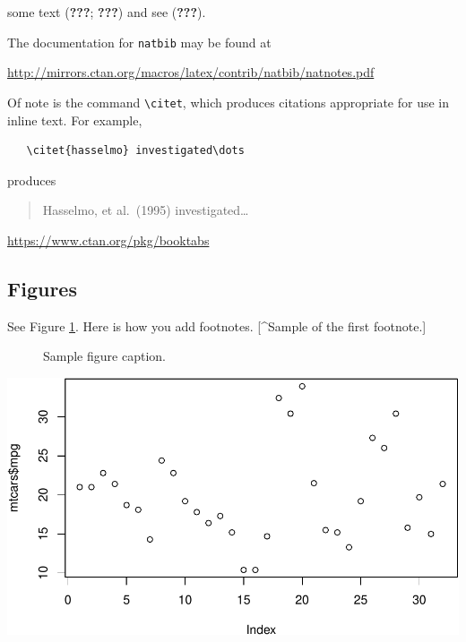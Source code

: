 \documentclass{article}
\begin{document}
\label{sec:others}

\lipsum[8] some text ({\textbf{???}}; {\textbf{???}}) and see
({\textbf{???}}).

The documentation for \verb+natbib+ may be found at

\begin{center}
  \url{http://mirrors.ctan.org/macros/latex/contrib/natbib/natnotes.pdf}
\end{center}

Of note is the command \verb+\citet+, which produces citations
appropriate for use in inline text. For example,

\begin{verbatim}
   \citet{hasselmo} investigated\dots
\end{verbatim}

produces

\begin{quote}
  Hasselmo, et al.\ (1995) investigated\dots
\end{quote}

\begin{center}
  \url{https://www.ctan.org/pkg/booktabs}
\end{center}

\hypertarget{figures}{%
\subsection{Figures}\label{figures}}

\lipsum[10] See Figure \ref{fig:fig1}. Here is how you add footnotes.
{[}\^{}Sample of the first footnote.{]}

\lipsum[11]

\begin{figure}
  \centering
  \fbox{\rule[-.5cm]{4cm}{4cm} \rule[-.5cm]{4cm}{0cm}}
  \caption{Sample figure caption.}
  \label{fig:fig1}
\end{figure}

\begin{center}\includegraphics{super-fx_files/figure-latex/unnamed-chunk-1-1} \end{center}
\end{document}
